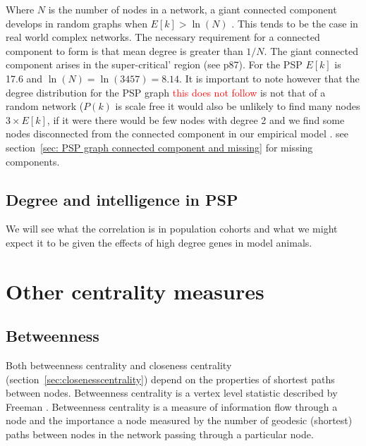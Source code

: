 Where $N$ is the number of nodes in a network, a giant connected component develops in random graphs when $E[k] > \ln (N)$ \cite{barabasi2016network}. This tends to be the case in real world complex networks. The necessary requirement for a connected component to form is that mean degree is greater than $1/N$. The giant connected component arises in the super-critical' region (see \cite{barabasi2016network} p87). For the PSP $E[k]$ is 17.6 and $\ln(N)=\ln(3457)=8.14$.  It is important to note however that the degree distribution for the PSP graph \textcolor{red}{this does not follow} is not that of a random network ($P(k)$ is scale free it would also be unlikely to find many nodes $ 3 \times E[k]$, if it were there would be few nodes with degree 2 and we find some nodes disconnected from the connected component in our empirical model .   see section~\ref{sec: PSP graph connected component and missing} for missing components.


\subsection{Degree and intelligence in PSP}
We will see what the correlation is in population cohorts and what we might expect it to be given the effects of high degree genes in model animals. 


\section{Other centrality measures}

\subsection{Betweenness}
\label{sec:Betweeness centrality}
Both betweenness centrality and closeness centrality (section~\ref{sec:closenesscentrality}) depend on the properties of shortest paths between nodes. Betweenness centrality is a vertex level statistic described by Freeman \cite{freeman1977set}. Betweenness centrality is a measure of information flow through a node and the importance a node measured by the number of geodesic (shortest) paths between nodes in the network passing through a particular node. 

